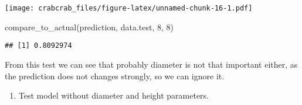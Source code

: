 \documentclass[
]{article}
\newenvironment{Shaded}{\begin{snugshade}}{\end{snugshade}}
\newcommand{\AttributeTok}[1]{\textcolor[rgb]{0.77,0.63,0.00}{#1}}
\newcommand{\DecValTok}[1]{\textcolor[rgb]{0.00,0.00,0.81}{#1}}
\newcommand{\FunctionTok}[1]{\textcolor[rgb]{0.00,0.00,0.00}{#1}}
\newcommand{\NormalTok}[1]{#1}
\newcommand{\OtherTok}[1]{\textcolor[rgb]{0.56,0.35,0.01}{#1}}
\newcommand{\SpecialCharTok}[1]{\textcolor[rgb]{0.00,0.00,0.00}{#1}}
\newcommand{\StringTok}[1]{\textcolor[rgb]{0.31,0.60,0.02}{#1}}
\providecommand{\tightlist}{%
  \setlength{\itemsep}{0pt}\setlength{\parskip}{0pt}}
\begin{document}
\begin{Shaded}
\end{Shaded}

\texttt{[image: crabcrab\_files/figure-latex/unnamed-chunk-16-1.pdf]}

\begin{Shaded}
\begin{Highlighting}[]
\FunctionTok{compare\_to\_actual}\NormalTok{(prediction, data.test, }\DecValTok{8}\NormalTok{, }\DecValTok{8}\NormalTok{)}
\end{Highlighting}
\end{Shaded}

\begin{verbatim}
## [1] 0.8092974
\end{verbatim}

From this test we can see that probably diameter is not that important
either, as the prediction does not changes strongly, so we can ignore
it.

\begin{enumerate}
\def\labelenumi{\arabic{enumi}.}
\setcounter{enumi}{4}
\tightlist
\item
  Test model without diameter and height parameters.
\end{enumerate}
\end{document}

